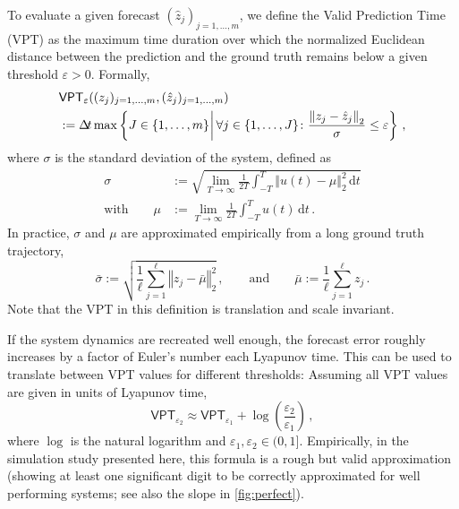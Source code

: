 \documentclass{article}
\newcommand{\lcb}{\left\lbrace} %
\newcommand{\rcb}{\right\rbrace} %
\newcommand{\cb}[1]{\lcb #1 \rcb} %
\newcommand{\lb}{\left(} %
\newcommand{\rb}{\right)} %
\newcommand{\br}[1]{\lb #1 \rb} %
\newcommand{\brOf}[1]{\!\br{#1}} %
\newcommand{\euclOf}[1]{\left\Vert#1\right\Vert_2}
\newcommand{\sizedMid}[2]{#1 \, \kern-\nulldelimiterspace\mathopen{}\left| \vphantom{#1}\,#2\right.\mathclose{}\kern-\nulldelimiterspace}
\newcommand{\setByEle}[2]{\cb{\sizedMid{#1}{#2}}}
\newcommand{\eqcm}{\,,} %
\newcommand{\eqfs}{\,.}
\newcommand{\dl}{\mathrm{d}} %
\newcommand{\stepsize}{\Delta\!t}
\newcommand{\vpt}[1]{\mathsf{VPT}_{#1}}
\begin{document}
To evaluate a given forecast $(\hat z_j)_{j=1, \dots, m}$, we define the Valid Prediction Time (VPT) as the maximum time duration over which the normalized Euclidean distance between the prediction and the ground truth remains below a given threshold $\varepsilon>0$. Formally,
\begin{align}
    &\vpt\varepsilon\brOf{(z_j)_{j=1, \dots, m}, (\hat z_j)_{j=1, \dots, m}}
    \\&:= 
    \stepsize \max\setByEle{J \in \{1, \dots, m\}}{\forall j\in\{1,\dots, J\}\colon \frac{\euclOf{z_j - \hat z_j}}{\sigma} \leq \varepsilon}
    \eqcm
\end{align}
where $\sigma$ is the standard deviation of the system, defined as
\begin{align}
    \sigma  &:= \sqrt{\lim_{T\to\infty}\frac{1}{2T}\int_{-T}^{T} \euclOf{u(t) - \mu}^2 \,\dl t}
    \\\text{with}\qquad
    \mu &:= \lim_{T\to\infty}\frac{1}{2T}\int_{-T}^{T} u(t) \,\dl t \eqfs
\end{align}
In practice, $\sigma$ and $\mu$ are approximated empirically from a long ground truth trajectory,
\begin{equation}
    \bar\sigma := \sqrt{\frac1\ell\sum_{j=1}^\ell\euclOf{z_j - \bar\mu}^2}\eqcm\qquad\text{and}\qquad
    \bar\mu := \frac1\ell\sum_{j=1}^\ell z_j \eqfs
\end{equation}
Note that the VPT in this definition is translation and scale invariant.

If the system dynamics are recreated well enough, the forecast error roughly increases by a factor of Euler's number each Lyapunov time. This can be used to translate between VPT values for different thresholds:
Assuming all VPT values are given in units of Lyapunov time,
\begin{equation}
    \vpt{\varepsilon_2} \approx \vpt{\varepsilon_1} + \log\brOf{\frac{\varepsilon_2}{\varepsilon_1}}
    \eqcm
\end{equation}
where $\log$ is the natural logarithm and $\varepsilon_1,\varepsilon_2 \in(0, 1]$. Empirically, in the simulation study presented here, this formula is a rough but valid approximation (showing at least one significant digit to be correctly approximated for well performing systems; see also the slope in \cref{fig:perfect}).
%
%
%
\end{document}
